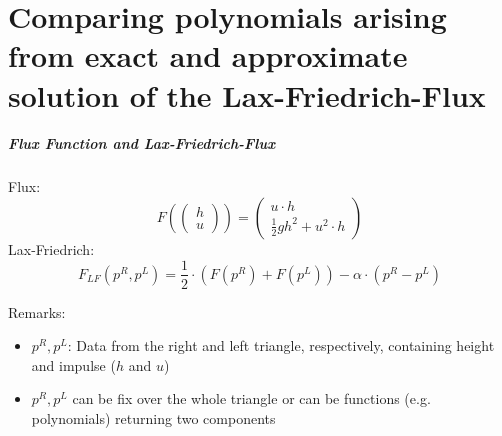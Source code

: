 \documentclass{beamer}
\begin{document}
\part{Comparing polynomials arising from exact and approximate solution of the Lax-Friedrich-Flux}
\label{part:polynomialstuff}

\begin{frame}
  \frametitle{Flux Function and Lax-Friedrich-Flux}
  Flux:
  \begin{equation}
    \label{eq:flux-function-definition}
    F\left(
      \begin{pmatrix}
        h \\ u
      \end{pmatrix}
    \right) = 
    \begin{pmatrix}
      u \cdot h \\
      \frac{1}{2} g h^2 + u^2 \cdot h
    \end{pmatrix}
  \end{equation}
  Lax-Friedrich:
  \begin{equation}
    \label{eq:lax-friedrich-definition}
    F_{LF}(p^R,p^L) = \dfrac{1}{2}\cdot (F(p^R) + F(p^L)) - \alpha \cdot (p^R - p^L)
  \end{equation}
  \begin{block}{Remarks:}
    \begin{itemize}
    \item $p^R, p^L$: Data from the right and left triangle, respectively, containing height and impulse ($h$ and $u$)
    \item $p^R, p^L$ can be fix over the whole triangle or can be functions (e.g. polynomials) returning two components
    \end{itemize}
  \end{block}
\end{frame}
\end{document}
